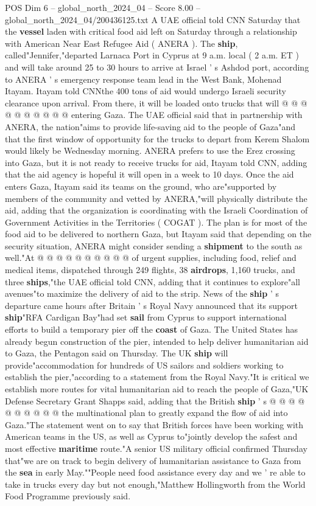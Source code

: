 \begin{textsample}{POS Dim 6 – global\_north\_2024\_04 – Score 8.00 – global\_north\_2024\_04/200436125.txt}
A UAE official told CNN Saturday that the \textbf{vessel} laden with critical food aid left on Saturday through a relationship with American Near East Refugee Aid ( ANERA ).
The \textbf{ship}, called"Jennifer,"departed Larnaca Port in Cyprus at 9 a.m. local ( 2 a.m.
ET ) and will take around 25 to 30 hours to arrive at Israel ' s Ashdod port, according to ANERA ' s emergency response team lead in the West Bank, Mohenad Itayam.
Itayam told CNNthe 400 tons of aid would undergo Israeli security clearance upon arrival.
From there, it will be loaded onto trucks that will @ @ @ @ @ @ @ @ @ @ entering Gaza.
The UAE official said that in partnership with ANERA, the nation"aims to provide life-saving aid to the people of Gaza"and that the first window of opportunity for the trucks to depart from Kerem Shalom would likely be Wednesday morning.
ANERA prefers to use the Erez crossing into Gaza, but it is not ready to receive trucks for aid, Itayam told CNN, adding that the aid agency is hopeful it will open in a week to 10 days.
Once the aid enters Gaza, Itayam said its teams on the ground, who are"supported by members of the community and vetted by ANERA,"will physically distribute the aid, adding that the organization is coordinating with the Israeli Coordination of Government Activities in the Territories ( COGAT ).
The plan is for most of the food aid to be delivered to northern Gaza, but Itayam said that depending on the security situation, ANERA might consider sending a \textbf{shipment} to the south as well."At @ @ @ @ @ @ @ @ @ @ of urgent supplies, including food, relief and medical items, dispatched through 249 flights, 38 \textbf{airdrops}, 1,160 trucks, and three \textbf{ships},"the UAE official told CNN, adding that it continues to explore"all avenues"to maximize the delivery of aid to the strip.
News of the \textbf{ship} ' s departure came hours after Britain ' s Royal Navy announced that its support \textbf{ship}"RFA Cardigan Bay"had set \textbf{sail} from Cyprus to support international efforts to build a temporary pier off the \textbf{coast} of Gaza.
The United States has already begun construction of the pier, intended to help deliver humanitarian aid to Gaza, the Pentagon said on Thursday.
The UK \textbf{ship} will provide"accommodation for hundreds of US sailors and soldiers working to establish the pier,"according to a statement from the Royal Navy."It is critical we establish more routes for vital humanitarian aid to reach the people of Gaza,"UK Defense Secretary Grant Shapps said, adding that the British \textbf{ship} ' s @ @ @ @ @ @ @ @ @ @ the multinational plan to greatly expand the flow of aid into Gaza."The statement went on to say that British forces have been working with American teams in the US, as well as Cyprus to"jointly develop the safest and most effective \textbf{maritime} route."A senior US military official confirmed Thursday that"we are on track to begin delivery of humanitarian assistance to Gaza from the \textbf{sea} in early May.""People need food assistance every day and we ' re able to take in trucks every day but not enough,"Matthew Hollingworth from the World Food Programme previously said.

\end{textsample}
